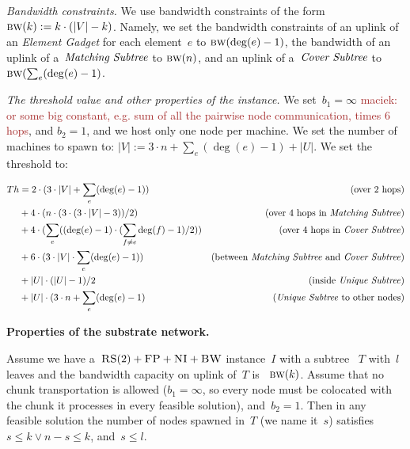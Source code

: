 \documentclass[preprint,12pt]{elsarticle}
\newcommand{\maciek}[1]{\textcolor{brown}{maciek: #1}}
\newcommand{\CC}{\textsc{NI}}
\newcommand{\FP}{\textsc{FP}}
\newcommand{\RS}{\textsc{RS}}
\newcommand{\BW}{\textsc{BW}}
\newcommand{\numNodes}{\ensuremath{|V|}}
\newcommand{\UnqSubtree}{{{\emph{Unique Subtree}}}}
\newcommand{\MatchSubtree}{{\emph{Matching Subtree}}}
\newcommand{\CoverSubtree}{{\emph{Cover Subtree}}}
\newcommand{\ElGadget}{{\emph{Element Gadget}}}
\newcommand{\Band}{\textsc{bw}}
\newcommand{\CostTrans}{\ensuremath{b_1}}
\newcommand{\CostCom}{\ensuremath{b_2}}
\newcommand{\Thr}{\ensuremath{Th}}
\begin{document}
\emph{Bandwidth constraints.}
We use bandwidth constraints of the form
$\Band(k) := k\cdot(\numNodes - k)$. Namely, we set the bandwidth
constraints of an uplink of an {\ElGadget} for each element~$e$ to 
$\Band(\deg(e)-1)$, the bandwidth of an uplink of a~$\MatchSubtree$ to 
$\Band(n)$, and an uplink of a~$\CoverSubtree$ to 
$\Band(\sum_e (\deg(e)-1)$.

\emph{The threshold value and other properties of the instance.}  We
set~$\CostTrans = \infty$ \maciek{or some big constant, e.g. sum of
  all the pairwise node communication, times 6 hops}, and
$\CostCom = 1$, and we host only one node per machine. We set the
number of machines to spawn to:
$\numNodes := 3\cdot n + \sum_e (\deg(e)-1) + |U|$. We set the
threshold to:

\begin{tiny}
\begin{align*}
  \Thr  & = 2\cdot (3\cdot \numNodes + \sum_e (\deg(e) - 1)) & \mbox{(over 2 hops)}\\
        & + 4\cdot (n\cdot (3 \cdot (3\cdot \numNodes - 3)) / 2) & \mbox{(over 4 hops in {\MatchSubtree})}\\
        & + 4\cdot (\sum_e((\deg(e) - 1)\cdot (\sum_{f\neq e} \deg(f) - 1)/2)) & \mbox{(over 4 hops in {\CoverSubtree})}\\
        & + 6\cdot (3\cdot \numNodes \cdot \sum_e(\deg(e) - 1)) & \mbox{(between {\MatchSubtree} and {\CoverSubtree})} \\
        & + |U|\cdot (|U|-1)/2 & \mbox{(inside {\UnqSubtree})} \\
        & + |U| \cdot (3\cdot n + \sum_e (\deg(e)-1) & \mbox{({\UnqSubtree} to other nodes)} \\
\end{align*}
\end{tiny}


\noindent \textbf{Properties of the substrate network.}

\begin{lemma}
  Assume we have a~$\RS(2)+\FP+\CC+\BW$ instance~$I$ with a subtree
 ~$T$ with~$l$ leaves and the bandwidth capacity on uplink of~$T$ is
 ~$\Band(k)$. Assume that no chunk transportation is allowed
  ($\CostTrans = \infty$, so every node must be colocated with the
  chunk it processes in every feasible solution), and~$\CostCom = 1$.
  Then in any feasible solution the number of nodes spawned in~$T$ (we
  name it~$s$) satisfies~$s \leq k \vee n-s\leq k$, and~$s \leq l$.
  \label{lem:bandwidth1}
\end{lemma}
\end{document}
